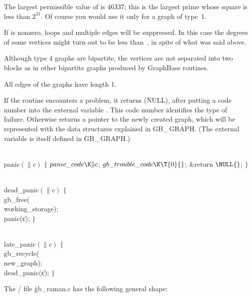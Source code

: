 The largest permissible value of  is 46337; this is the largest
prime whose square is less than $2^{31}$. Of course you would use
it only for a graph of type~1.

If  is nonzero, loops and multiple edges will be suppressed.
In this case the degrees of some vertices might turn out to be less than~,
in spite of what was said above.

Although type 4 graphs are bipartite, the vertices
are not separated into two blocks as in other bipartite
graphs produced by GraphBase routines.

All edges of the graphs have length 1.

\fi

If the  routine encounters a problem, it returns \PB{$%
\NULL$}
(\.{NULL}), after putting a code number into the external variable
. This code number identifies the type of failure.
Otherwise  returns a pointer to the newly created graph, which
will be represented with the data structures explained in {\sc GB\_\,GRAPH}.
(The external variable  is itself defined in
{\sc GB\_\,GRAPH}.)

\Y\B\4\D\\{panic}$(\|c)$\5
${}\{{}$\5
\1${}\\{panic\_code}\K\|c{}$;\5
${}\\{gb\_trouble\_code}\K\T{0}{}$;\5
\&{return} ${}\NULL{}$;\5
${}\}{}$\2\par
\B\4\D\\{dead\_panic}$(\|c)$\6
${}\{{}$\5
\1\\{gb\_free}(\\{working\_storage});\5
\\{panic}(\|c);\5
${}\}{}$\2\par
\B\4\D\\{late\_panic}$(\|c)$\6
${}\{{}$\5
\1\\{gb\_recycle}(\\{new\_graph});\5
\\{dead\_panic}(\|c);\5
${}\}{}$\2\par
\fi

The \CEE/ file \.{gb\_raman.c} has the following general shape:

